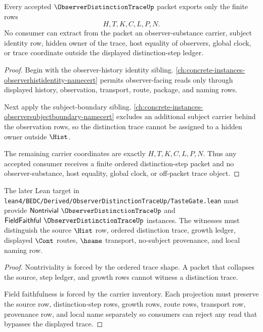 \begin{theorem}
\label{thm:observer-distinction-trace-nonescape}
Every accepted $\ObserverDistinctionTraceUp$ packet exports only the finite rows
$$
H,T,K,C,L,P,N.
$$
No consumer can extract from the packet an observer-substance carrier, subject identity row, hidden owner of the trace, host equality of observers, global clock, or trace coordinate outside the displayed distinction-step ledger.
\end{theorem}
\begin{proof}
Begin with the observer-history identity sibling. \autoref{ch:concrete-instances-observerhistidentity-namecert} permits observer-facing reads only through displayed history, observation, transport, route, package, and naming rows.

Next apply the subject-boundary sibling. \autoref{ch:concrete-instances-observersubjectboundary-namecert} excludes an additional subject carrier behind the observation rows, so the distinction trace cannot be assigned to a hidden owner outside $\Hist$.

The remaining carrier coordinates are exactly $H,T,K,C,L,P,N$. Thus any accepted consumer receives a finite ordered distinction-step packet and no observer-substance, host equality, global clock, or off-packet trace object.
\end{proof}

\begin{theorem}
\label{thm:observer-distinction-trace-tastegate-obligation}
The later Lean target in \texttt{lean4/BEDC/Derived/ObserverDistinctionTraceUp/TasteGate.lean} must provide $\mathsf{Nontrivial}\ \ObserverDistinctionTraceUp$ and $\mathsf{FieldFaithful}\ \ObserverDistinctionTraceUp$ instances. The witnesses must distinguish the source $\Hist$ row, ordered distinction trace, growth ledger, displayed $\Cont$ routes, $\hsame$ transport, no-subject provenance, and local naming row.
\end{theorem}
\begin{proof}
Nontriviality is forced by the ordered trace shape. A packet that collapses the source, step ledger, and growth rows cannot witness a distinction trace.

Field faithfulness is forced by the carrier inventory. Each projection must preserve the source row, distinction-step rows, growth rows, route rows, transport row, provenance row, and local name separately so consumers can reject any read that bypasses the displayed trace.
\end{proof}

